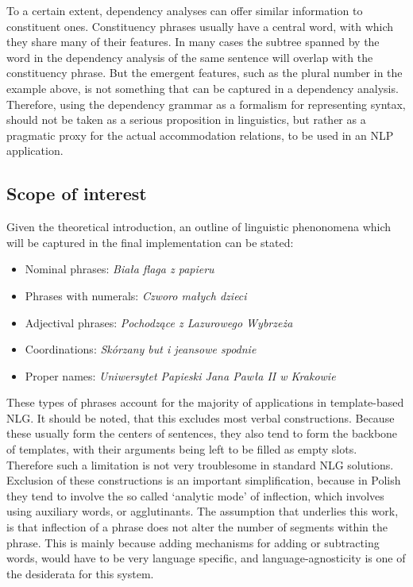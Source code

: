 \documentclass[12pt]{article}
\newcommand{\gloss}[1]{\vspace{10pt}\indent\textit{#1}\vspace{5pt}}
\begin{document}
To a certain extent, dependency analyses can offer similar information to constituent ones. Constituency phrases usually have a central word, with which they share many of their features. In many cases the subtree spanned by the word in the dependency analysis of the same sentence will overlap with the constituency phrase. But the emergent features, such as the plural number in the example above, is not something that can be captured in a dependency analysis. Therefore, using the dependency grammar as a formalism for representing syntax, should not be taken as a serious proposition in linguistics, but rather as a pragmatic proxy for the actual accommodation relations, to be used in an NLP application.

\subsection{Scope of interest}
\label{scope of interest}
Given the theoretical introduction, an outline of linguistic phenonomena which will be captured in the final implementation can be stated:
\begin{itemize}
	\item Nominal phrases: \gloss{Biała flaga z papieru}\vspace{-10pt}
	\item Phrases with numerals: \gloss{Czworo małych dzieci}\vspace{-10pt}
	\item Adjectival phrases: \gloss{Pochodzące z Lazurowego Wybrzeża}\vspace{-10pt}
	\item Coordinations: \gloss{Skórzany but i jeansowe spodnie}\vspace{-10pt}
	\item Proper names: \gloss{Uniwersytet Papieski Jana Pawła II w Krakowie}\vspace{-10pt}
\end{itemize}

These types of phrases account for the majority of applications in template-based NLG. It should be noted, that this excludes most verbal constructions. Because these usually form the centers of sentences, they also tend to form the backbone of templates, with their arguments being left to be filled as empty slots. Therefore such a limitation is not very troublesome in standard NLG solutions. Exclusion of these constructions is an important simplification, because in Polish they tend to involve the so called `analytic mode' of inflection, which involves using auxiliary words, or agglutinants. The assumption that underlies this work, is that inflection of a phrase does not alter the number of segments within the phrase. This is mainly because adding mechanisms for adding or subtracting words, would have to be very language specific, and language-agnosticity is one of the desiderata for this system.
\end{document}
